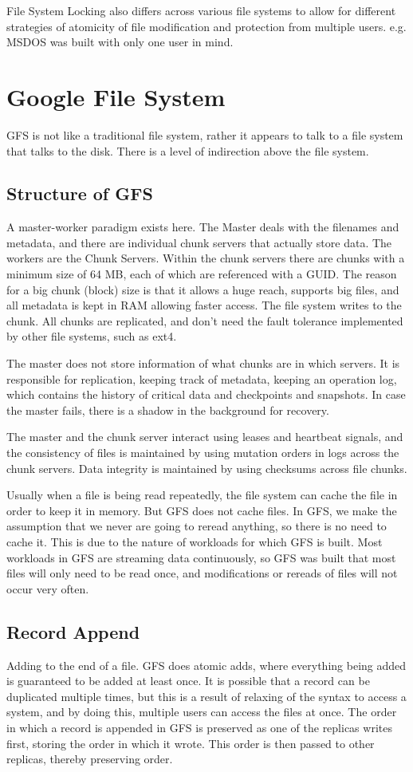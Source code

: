 \documentclass[twoside]{article}
\begin{document}
File System Locking also differs across various file systems to allow for different strategies of atomicity of file modification and protection from multiple users. e.g. MSDOS was built with only one user in mind.
\section{Google File System}
GFS is not like a traditional file system, rather it appears to talk to a file system that talks to the disk. There is a level of indirection above the file system.
\subsection{Structure of GFS}
A master-worker paradigm exists here. The Master deals with the filenames and metadata, and there are individual chunk servers that actually store data. The workers are the Chunk Servers. Within the chunk servers there are chunks with a minimum size of 64 MB, each of which are referenced with a GUID. The reason for a big chunk (block) size is that it allows a huge reach, supports big files, and all metadata is kept in RAM allowing faster access. The file system writes to the chunk. All chunks are replicated, and don't need the fault tolerance implemented by other file systems, such as ext4.

The master does not store information of what chunks are in which servers. It is responsible for replication, keeping track of metadata, keeping an operation log, which contains the history of critical data and checkpoints and snapshots. In case the master fails, there is a shadow in the background for recovery. 

The master and the chunk server interact using leases and heartbeat signals, and the consistency of files is maintained by using mutation orders in logs across the chunk servers. Data integrity is maintained by using checksums across file chunks.

Usually when a file is being read repeatedly, the file system can cache the file in order to keep it in memory. But GFS does not cache files. In GFS, we make the assumption that we never are going to reread anything, so there is no need to cache it. This is due to the nature of workloads for which GFS is built. Most workloads in GFS are streaming data continuously, so GFS was built that most files will only need to be read once, and modifications or rereads of files will not occur very often.
\subsection {Record Append} 
Adding to the end of a file. GFS does atomic adds, where everything being added is guaranteed to be added at least once. It is possible that a record can be duplicated multiple times, but this is a result of relaxing of the syntax to access a system, and by doing this, multiple users can access the files at once. The order in which a record is appended in GFS is preserved as one of the replicas writes first, storing the order in which it wrote. This order is then passed to other replicas, thereby preserving order.
\end{document}

